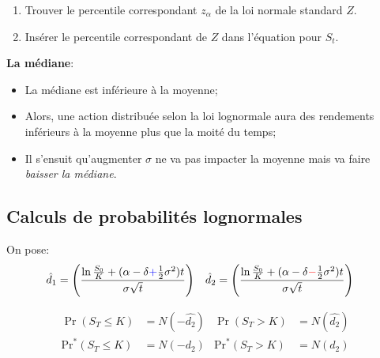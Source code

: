\documentclass[10pt, french]{article}
\begin{document}
\begin{multicols*}{2}
\begin{distributions}
\begin{enumerate}[label	=	\circled{\arabic*}{lightgray}]
	\item	Trouver le percentile correspondant $z_{\alpha}$ de la loi normale standard $Z$.
	\item	Insérer le percentile correspondant de $Z$ dans l'équation pour $S_{t}$.
\end{enumerate}
\end{distributions}

\textbf{La médiane}:
\begin{itemize}
	\item	La médiane  est inférieure à la moyenne;
	\item	Alors, une action distribuée selon la loi lognormale aura des rendements inférieurs à la moyenne plus que la moité du temps;
	\item	Il s'ensuit qu'augmenter $\sigma$ ne va pas impacter la moyenne mais va faire \textit{baisser la médiane}.
\end{itemize}

\columnbreak
\subsection*{Calculs de probabilités lognormales}
On pose:
\begin{align*}
	\hat{d}_{1}
	&=	\left(
			\frac{\ln\frac{S_{0}}{K} + (\alpha - \delta {\color{blue}+} \frac{1}{2}\sigma^{2})t}
	 			 {\sigma\sqrt{t}}
		\right)	&
	\hat{d}_{2}
	&=	\left(
			\frac{\ln\frac{S_{0}}{K} + (\alpha - \delta {\color{red}-} \frac{1}{2}\sigma^{2})t}
	 			 {\sigma\sqrt{t}}
		\right)
\end{align*}

\begin{distributions}
\begin{align*}
	\Pr(S_{T}	\leq		K) 
	&=	N(-\hat{d_{2}})	&
	\Pr(S_{T}	>		K) 
	&=	N(\hat{d_{2}})	\\
	\text{Pr}^{*}(S_{T}	\leq		K) 
	&=	N(-d_{2})	&
	\text{Pr}^{*}(S_{T}	>		K) 
	&=	N(d_{2})	
\end{align*}
\end{distributions}


\end{multicols*}
\end{document}
